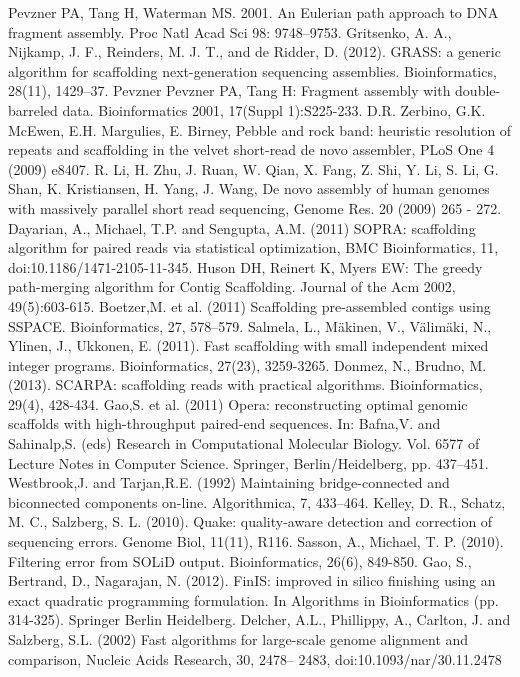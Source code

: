 \documentclass[11pt]{article}
\begin{document}
\begin{thebibliography}{widest entry}
   Pevzner PA, Tang H, Waterman MS. 2001. An
    Eulerian path approach to DNA fragment assembly. Proc Natl Acad Sci 98:
    9748–9753.
   Gritsenko, A. A., Nijkamp, J. F., Reinders, M. J. T.,
    and de Ridder, D. (2012). GRASS: a generic algorithm for scaffolding
    next-generation sequencing assemblies. Bioinformatics, 28(11), 1429–37.
   Pevzner Pevzner PA, Tang H: Fragment assembly with
    double-barreled data. Bioinformatics 2001, 17(Suppl 1):S225-233.
   D.R. Zerbino, G.K. McEwen, E.H. Margulies, E.
    Birney, Pebble and rock band: heuristic resolution of repeats and
    scaffolding in the velvet short-read de novo assembler, PLoS One 4 (2009)
    e8407.
   R. Li, H. Zhu, J. Ruan, W. Qian, X. Fang, Z. Shi, Y. Li,
    S. Li, G. Shan, K. Kristiansen, H. Yang, J. Wang, De novo assembly of
    human genomes with massively parallel short read sequencing, Genome Res. 20
    (2009) 265 - 272.
   Dayarian, A., Michael, T.P. and Sengupta, A.M. (2011) SOPRA:
    scaffolding algorithm for paired reads via statistical optimization, BMC
    Bioinformatics, 11, doi:10.1186/1471-2105-11-345.
   Huson DH, Reinert K, Myers EW: The greedy
    path-merging algorithm for Contig Scaffolding. Journal of the Acm 2002,
    49(5):603-615.
   Boetzer,M. et al. (2011) Scaffolding pre-assembled contigs
    using SSPACE. Bioinformatics, 27, 578–579.
   Salmela, L., Mäkinen, V., Välimäki, N., Ylinen, J., Ukkonen,
    E. (2011). Fast scaffolding with small independent mixed integer programs.
    Bioinformatics, 27(23), 3259-3265.
   Donmez, N., Brudno, M. (2013). SCARPA: scaffolding reads
    with practical algorithms. Bioinformatics, 29(4), 428-434.
   Gao,S. et al. (2011) Opera: reconstructing optimal genomic
    scaffolds with high-throughput paired-end sequences. In: Bafna,V. and
    Sahinalp,S. (eds) Research in Computational Molecular Biology. Vol. 6577 of
    Lecture Notes in Computer Science. Springer, Berlin/Heidelberg, pp. 437–451.
   Westbrook,J. and Tarjan,R.E. (1992) Maintaining
    bridge-connected and biconnected components on-line. Algorithmica, 7,
    433–464.
   Kelley, D. R., Schatz, M. C., Salzberg, S. L. (2010). Quake:
    quality-aware detection and correction of sequencing errors. Genome Biol,
    11(11), R116.
   Sasson, A., Michael, T. P. (2010). Filtering error
    from SOLiD output. Bioinformatics, 26(6), 849-850.
   Gao, S., Bertrand, D., Nagarajan, N. (2012). FinIS: improved
    in silico finishing using an exact quadratic programming formulation. In
    Algorithms in Bioinformatics (pp. 314-325). Springer Berlin Heidelberg.
   Delcher, A.L., Phillippy, A., Carlton, J. and Salzberg, S.L.
    (2002) Fast algorithms for large-scale genome alignment and comparison,
    Nucleic Acids Research, 30, 2478– 2483, doi:10.1093/nar/30.11.2478
\end{thebibliography}
\end{document}
